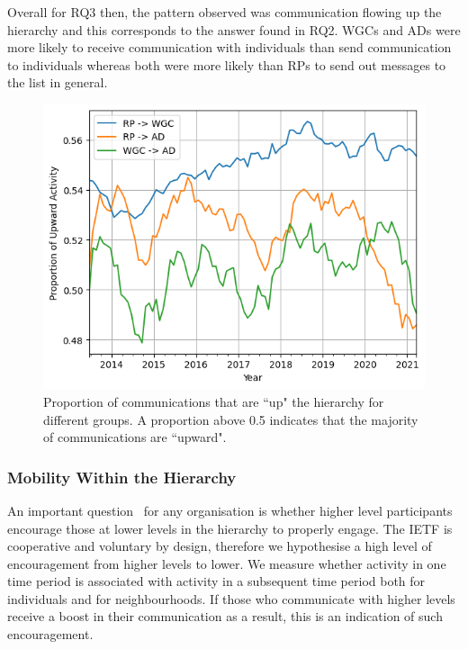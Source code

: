\documentclass[twocolumn,10pt]{article}
\newlength{\figureWidthOneColumn}
\begin{document}
Overall for RQ3 then, the pattern observed was communication flowing up the
hierarchy and this corresponds to the answer found in RQ2. WGCs and ADs
were more likely to receive communication with individuals than send
communication to individuals whereas both were more likely than RPs to send
out messages to the list in general. 

\begin{figure}[t]
  \centering
  \includegraphics[width=\figureWidthOneColumn]{figures-prev/icwsm-2024/up_hierarchy_communication_ratios.png}
  \caption{
    Proportion of communications that are ``up" the hierarchy for different
    groups. A proportion above 0.5 indicates that the majority of
    communications are ``upward".
  }
  \label{fig:inter_strata}
\end{figure}

\subsubsection{Mobility Within the Hierarchy}
\label{sec:org-dynamics:hierarchy:rq4}



An important question~\cite{li2021does,guo2020inclusive} for any
organisation is whether higher level participants encourage those at lower
levels in the hierarchy to properly engage. The IETF is cooperative and
voluntary by design, therefore we hypothesise a high level of encouragement
from higher levels to lower. We measure whether activity in one time period
is associated with activity in a subsequent time period both for
individuals and for neighbourhoods. If those who communicate with higher
levels receive a boost in their communication as a result, this is an
indication of such encouragement.
\end{document}
